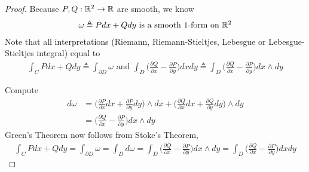 \documentclass{report}
\begin{document}
\begin{proof}
Because $P,Q:\mathbb{R}^2 \rightarrow \mathbb{R}$ are smooth, we know 
\begin{align*}
\omega \triangleq  Pdx + Qdy \text{ is a smooth 1-form on }\mathbb{R}^2
\end{align*}
Note that all interpretations  (Riemann, Riemann-Stieltjes, Lebesgue or Lebesgue-Stieltjes integral) equal to 
\begin{align*}
\int_C P dx +Q dy \triangleq \int_{\partial D} \omega  \text{ and } \int_D \Big( \frac{\partial Q}{\partial x}- \frac{\partial P}{\partial y} \Big)dxdy \triangleq \int_D  \Big( \frac{\partial Q}{\partial x}- \frac{\partial P}{\partial y} \Big) dx \wedge  dy  
\end{align*}


Compute 
\begin{align*}
d\omega &= \Big(\frac{\partial P}{\partial x}dx+ \frac{\partial P}{\partial y}dy\Big)\wedge  dx + \Big( \frac{\partial Q}{\partial x}dx+ \frac{\partial Q}{\partial y}dy \Big) \wedge  dy  \\
&= \Big( \frac{\partial Q}{\partial x}- \frac{\partial P}{\partial y} \Big)dx\wedge  dy 
\end{align*}
Green's Theorem now follows from Stoke's Theorem, 
\begin{align*}
\int_C Pdx + Qdy= \int_{\partial D} \omega = \int_{D} d\omega = \int_D  \Big( \frac{\partial Q}{\partial x}- \frac{\partial P}{\partial y} \Big)dx\wedge  dy  = \int_D  \Big( \frac{\partial Q}{\partial x}- \frac{\partial P}{\partial y} \Big)dxdy 
\end{align*}
\end{proof}
\end{document}
